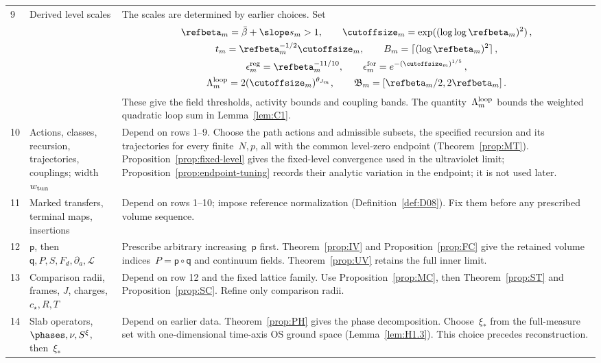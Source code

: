 \begin{longtable}{@{}p{}p{}p{}@{}}
9 & \raggedright Derived level scales & The scales are determined by earlier choices. Set
\begin{gather*}
\refbeta_m=\bar\beta+\slope s_m>1,\qquad
\cutoffsize_m=\exp((\log\log\refbeta_m)^2)\,,\\
t_m=\refbeta_m^{-1/2}\cutoffsize_m,\qquad
B_m=\lceil(\log\refbeta_m)^2\rceil\,,\\
\epsilon_m^{\rm reg}=\refbeta_m^{-11/10},\qquad
\epsilon_m^{\rm for}=e^{-(\cutoffsize_m)^{1/5}}\,,\\
\Lambda_m^{\rm loop}=2(\cutoffsize_m)^{\theta_{J_m}},\qquad
\mathfrak B_m=[\refbeta_m/2,2\refbeta_m]\,.
\end{gather*} These give the field thresholds, activity bounds and coupling bands. The quantity~$\Lambda_m^{\rm loop}$ bounds the weighted quadratic loop sum in Lemma~\ref{lem:C1}.\\[3pt]
10 & \raggedright Actions, classes, recursion, trajectories, couplings; width~$w_{\rm tun}$ & Depend on rows 1--9. Choose the path actions and admissible subsets, the specified recursion and its trajectories for every finite~$N,p$, all with the common level-zero endpoint (Theorem~\ref{prop:MT}). Proposition~\ref{prop:fixed-level} gives the fixed-level convergence used in the ultraviolet limit; Proposition~\ref{prop:endpoint-tuning} records their analytic variation in the endpoint; it is not used later.\\[3pt]
11 & \raggedright Marked transfers, terminal maps, insertions & Depend on rows 1--10; impose reference normalization (Definition~\ref{def:D08}). Fix them before any prescribed volume sequence.\\[3pt]
12 & \raggedright $\mathsf p$, then $\mathsf q,P,S,F_d,\partial_a,\mathcal L$ & Prescribe arbitrary increasing~$\mathsf p$ first. Theorem~\ref{prop:IV} and Proposition~\ref{prop:FC} give the retained volume indices~$P=\mathsf p\circ\mathsf q$ and continuum fields. Theorem~\ref{prop:UV} retains the full inner limit.\\[3pt]
13 & \raggedright Comparison radii, frames, $J$, charges, $c_\star,R,T$ & Depend on row 12 and the fixed lattice family. Use Proposition~\ref{prop:MC}, then Theorem~\ref{prop:ST} and Proposition~\ref{prop:SC}. Refine only comparison radii.\\[3pt]
14 & \raggedright Slab operators, $\phases,\nu,S^\xi$, then~$\xi_*$ & Depend on earlier data. Theorem~\ref{prop:PH} gives the phase decomposition. Choose~$\xi_*$ from the full-measure set with one-dimensional time-axis OS ground space (Lemma~\ref{lem:H1.3}). This choice precedes reconstruction.\\[3pt]

\end{longtable}
